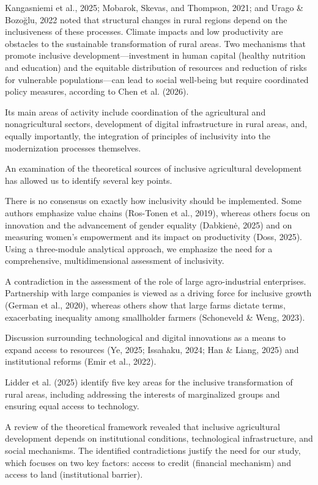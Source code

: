 \documentclass[
]{article}
\begin{document}
Kangasniemi et al., 2025; Mobarok, Skevas, and Thompson, 2021; and Urago
\& Bozoğlu, 2022 noted that structural changes in rural regions depend
on the inclusiveness of these processes. Climate impacts and low
productivity are obstacles to the sustainable transformation of rural
areas. Two mechanisms that promote inclusive development---investment in
human capital (healthy nutrition and education) and the equitable
distribution of resources and reduction of risks for vulnerable
populations---can lead to social well-being but require coordinated
policy measures, according to Chen et al. (2026).

Its main areas of activity include coordination of the agricultural and
nonagricultural sectors, development of digital infrastructure in rural
areas, and, equally importantly, the integration of principles of
inclusivity into the modernization processes themselves.

An examination of the theoretical sources of inclusive agricultural
development has allowed us to identify several key points.

There is no consensus on exactly how inclusivity should be implemented.
Some authors emphasize value chains (Ros-Tonen et al., 2019), whereas
others focus on innovation and the advancement of gender equality
(Dabkienė, 2025) and on measuring women's empowerment and its impact on
productivity (Doss, 2025). Using a three-module analytical approach, we
emphasize the need for a comprehensive, multidimensional assessment of
inclusivity.

A contradiction in the assessment of the role of large agro-industrial
enterprises. Partnership with large companies is viewed as a driving
force for inclusive growth (German et al., 2020), whereas others show
that large farms dictate terms, exacerbating inequality among
smallholder farmers (Schoneveld \& Weng, 2023).

Discussion surrounding technological and digital innovations as a means
to expand access to resources (Ye, 2025; Issahaku, 2024; Han \& Liang,
2025) and institutional reforms (Emir et al., 2022).

Lidder et al. (2025) identify five key areas for the inclusive
transformation of rural areas, including addressing the interests of
marginalized groups and ensuring equal access to technology.

A review of the theoretical framework revealed that inclusive
agricultural development depends on institutional conditions,
technological infrastructure, and social mechanisms. The identified
contradictions justify the need for our study, which focuses on two key
factors: access to credit (financial mechanism) and access to land
(institutional barrier).
\end{document}
